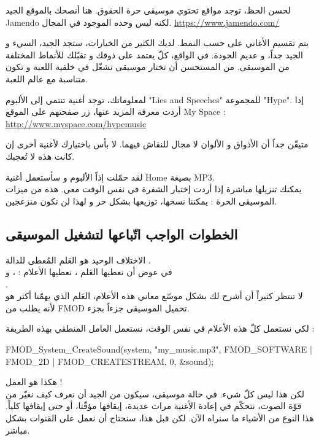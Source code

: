لحسن الحظ، توجد مواقع تحتوي موسيقى حرة الحقوق. هنا أنصحك بالموقع الجيد
\textenglish{Jamendo}
لكنه ليس وحده الموجود في المجال.
\url{https://www.jamendo.com/}

يتم تقسيم الأغاني على حسب النمط. لديك الكثير من الخيارات، ستجد الجيد، السيء و الجيد جداً، و عديم الجودة. في الواقع، كلّ يعتمد على ذوقك و تقبّلك للأنماط المختلفة من الموسيقى. من المستحسن أن تختار موسيقى تشغّل في خلفية اللعبة و تكون متناسبة مع عالم اللعبة.

لمعلوماتك، توجد أغنية تنتمي إلى الألبوم
"\textenglish{Lies and Speeches}"
للمجموعة
"\textenglish{Hype}".
إذا أردت معرفة المزيد عنها، زر صفحتهم على الموقع
\textenglish{My Space} :
\url{http://www.myspace.com/hypemusic}

\begin{information}
متيقّن جداً أن الأذواق و الألوان لا مجال للنقاش فيهما. لا بأس باختيارك لأغنية أخرى إن كانت هذه لا تُعجبك.
\end{information}

لقد حمّلت إذاً الألبوم و سأستعمل أغنية
\textenglish{Home}
بصيغة
\textenglish{MP3}.\\
يمكنك تنزيلها مباشرة إذا أردت إختبار الشفرة في نفس الوقت معي. هذه من ميزات الموسيقى الحرة : يمكننا نسخها، توزيعها بشكل حر و لهذا لن نكون منزعجين.

\subsection{الخطوات الواجب اتّباعها لتشغيل الموسيقى}

الاختلاف الوحيد هو العَلم المُعطى للدالة
.\\
في عوض أن نعطيها العَلم
،
نعطيها الأعلام :
،  و\\
.\\
لا تنتظر كثيراً أن أشرح لك بشكل موسّع معاني هذه الأعلام، العَلم الذي يهمّنا أكثر هو
لأنه يطلب من
\textenglish{FMOD}
تحميل الموسيقى جزءاً بجزء.

لكي نستعمل كلّ هذه الأعلام في نفس الوقت، نستعمل العامل المنطقي
\InlineCode{|}
بهذه الطريقة :

\begin{Csource}
FMOD_System_CreateSound(system, "my_music.mp3", FMOD_SOFTWARE | FMOD_2D | FMOD_CREATESTREAM, 0, &sound);
\end{Csource}

هكذا هو العمل  !\\
لكن هذا ليس كلّ شيء. في حالة موسيقى، سيكون من الجيد أن نعرف كيف نغيّر من قوّة الصوت، نتحكّم في إعادة الأغنية مرات عديدة، إيقافها مؤقّتا، أو حتى إيقافها كلياً. هذا النوع من الأشياء ما سنراه الآن. لكن قبل هذا، سنحتاج أن نعمل على القنوات بشكل مباشر.

